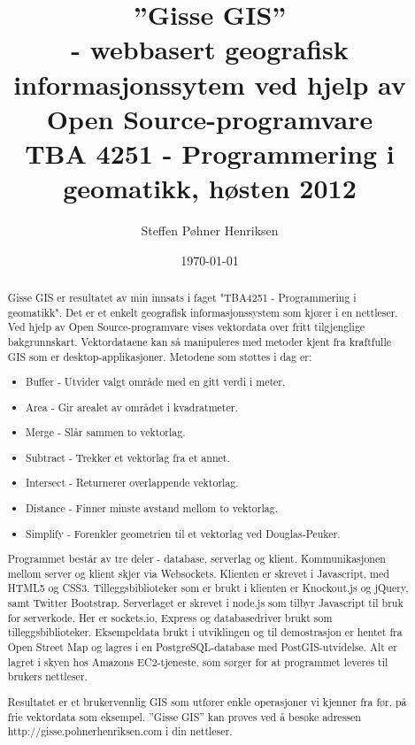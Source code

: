 \documentclass[12pt,twoside,onecolumn]{article}
\title{\textbf{''Gisse GIS''  \\- webbasert geografisk informasjonssytem ved hjelp av\\ Open Source-programvare}
\\ \normalsize TBA 4251 - Programmering i geomatikk, høsten 2012}
\author{Steffen Pøhner Henriksen}
\date{\today}
\makeatletter
\def\maketitle{%
  \null
  \thispagestyle{empty}%
  \vskip 1cm
  \begin{flushright}
    \normalfont\huge\@title\par
  \end{flushright}
  \vfil
  \begin{flushright}
    \LARGE \strut \@author \par
  \end{flushright}
  \par
  \vfil
  \vfil
  \null
  }
\makeatother
\begin{document}
\maketitle

\vspace{3cm}

\pagebreak

\begin{abstract}

	Gisse GIS er resultatet av min innsats i faget "TBA4251 - Programmering i geomatikk". Det er et enkelt geografisk informasjonssystem som kjører i en nettleser. Ved hjelp av Open Source-programvare vises vektordata over fritt tilgjenglige bakgrunnskart. Vektordataene kan så manipuleres med metoder kjent fra kraftfulle GIS som er desktop-applikasjoner. Metodene som støttes i dag er:
	
	\begin{itemize}
		\item Buffer - Utvider valgt område med en gitt verdi i meter.
		\item Area - Gir arealet av området i kvadratmeter.
		\item Merge - Slår sammen to vektorlag.
		\item Subtract - Trekker et vektorlag fra et annet.
		\item Intersect - Returnerer overlappende vektorlag.
		\item Distance - Finner minste avstand mellom to vektorlag.
		\item Simplify - Forenkler geometrien til et vektorlag ved Douglas-Peuker. 
	\end{itemize}
	
	Programmet består av tre deler - database, serverlag og klient. Kommunikasjonen mellom server og klient skjer via Websockets\cite{websockets}. Klienten er skrevet i Javascript, med HTML5 og CSS3. Tilleggsbiblioteker som er brukt i klienten er Knockout.js og jQuery, samt Twitter Bootstrap. Serverlaget er skrevet i node.js som tilbyr Javascript til bruk for serverkode. Her er sockets.io, Express og databasedriver brukt som tilleggsbiblioteker. Eksempeldata brukt i utviklingen og til demostrasjon er hentet fra Open Street Map og lagres i en PostgreSQL-database med PostGIS-utvidelse. Alt er lagret i skyen hos Amazons EC2-tjeneste, som sørger for at programmet leveres til brukers nettleser. 
	
	Resultatet er et brukervennlig GIS som utfører enkle operasjoner vi kjenner fra før, på frie vektordata som eksempel. ''Gisse GIS'' kan prøves ved å besøke adressen http://gisse.pohnerhenriksen.com i din nettleser.
	
\end{abstract}
\newpage
\end{document}
